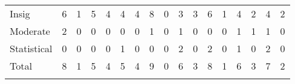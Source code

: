 \begin{tabular}{lcccccccccccccccc}
\hline \noalign{\smallskip}Insig & 6 & 1 & 5 & 4 & 4 & 4 & 8 & 0 & 3 & 3 & 6 & 1 & 4 & 2 & 4 & 2\\
Moderate & 2 & 0 & 0 & 0 & 0 & 0 & 1 & 0 & 1 & 0 & 0 & 0 & 1 & 1 & 1 & 0\\
Statistical & 0 & 0 & 0 & 0 & 1 & 0 & 0 & 0 & 2 & 0 & 2 & 0 & 1 & 0 & 2 & 0\\
Total & 8 & 1 & 5 & 4 & 5 & 4 & 9 & 0 & 6 & 3 & 8 & 1 & 6 & 3 & 7 & 2\\
\noalign{\smallskip}\hline\end{tabular}\\
